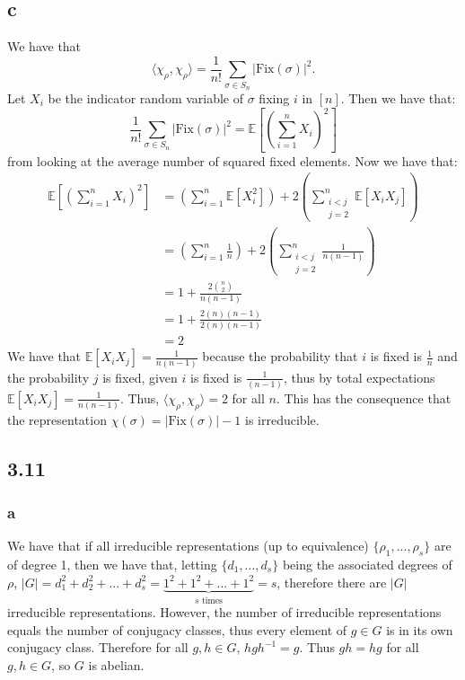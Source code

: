 \documentclass[]{article}
\newcommand{\fix}{\text{Fix}}
\begin{document}
\subsection*{c}
We have that \begin{equation}
	\langle \chi_\rho, \chi_\rho \rangle = \frac{1}{n!}\sum_{\sigma \in S_n} |\fix(\sigma)|^2.
\end{equation}
Let $X_i$ be the indicator random variable of $\sigma$ fixing $i$ in $[n]$. Then we have that:
\begin{equation}
	\frac{1}{n!}\sum_{\sigma \in S_n} |\fix(\sigma)|^2 = \mathbb{E}\left[\left(\sum_{i=1}^{n} X_i\right)^2\right]
\end{equation}
from looking at the average number of squared fixed elements. Now we have that:
\begin{align*}
	\mathbb{E}\left[\left(\sum_{i=1}^{n} X_i\right)^2\right] &= \left(\sum_{i=1}^{n}\mathbb{E}\left[X_i^2 \right] \right) + 2\left(\sum_{\substack{
		i < j\\ j = 2
	}}^{n}\mathbb{E}\left[X_i X_j \right] \right)\\
	&= \left(\sum_{i=1}^{n}\frac{1}{n} \right) + 2 \left(\sum_{\substack{
		i < j\\ j = 2
	}}^{n}\frac{1}{n(n-1)}\right)\\
	&= 1 + \frac{2 \binom{n}{2}}{n(n-1)}\\
	&= 1 + \frac{2(n)(n-1)}{2(n)(n-1)}\\
	&= 2
\end{align*}
We have that $\mathbb{E}\left[X_i X_j \right] = \frac{1}{n(n-1)}$ because the probability that $i$ is fixed is $\frac{1}{n}$ and the probability $j$ is fixed, given $i$ is fixed is $\frac{1}{(n-1)}$, thus by total expectations $\mathbb{E}\left[X_i X_j \right] = \frac{1}{n(n-1)}$.
Thus, $\langle \chi_\rho, \chi_\rho \rangle = 2$ for all $n$.
This has the consequence that the representation $\chi(\sigma) = |\fix(\sigma)| - 1$ is irreducible. 
\subsection*{3.11}
\subsubsection*{a}
We have that if all irreducible representations (up to equivalence) $\lbrace \rho_1, ..., \rho_s \rbrace$ are of degree 1, then we have that, letting $\lbrace d_1, ..., d_s \rbrace$ being the associated degrees of $\rho$, $|G| = d_1^2 + d_2^2 + ... + d_s^2 = \underbrace{1^2 + 1^2 + ... +1^2}_{s\text{ times}} = s$, therefore there are $|G|$ irreducible representations. However, the number of irreducible representations equals the number of conjugacy classes, thus every element of $g \in G$ is in its own conjugacy class. Therefore for all $g, h \in G$, $hgh^{-1} = g$. Thus $gh = hg$ for all $g, h \in G$, so $G$ is abelian. 
\end{document}
